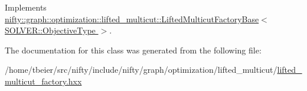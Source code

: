 Implements \hyperlink{classnifty_1_1graph_1_1optimization_1_1lifted__multicut_1_1LiftedMulticutFactoryBase_a96b3ee71a961471371c92be56d25de16}{nifty\+::graph\+::optimization\+::lifted\+\_\+multicut\+::\+Lifted\+Multicut\+Factory\+Base$<$ S\+O\+L\+V\+E\+R\+::\+Objective\+Type $>$}.



The documentation for this class was generated from the following file\+:\begin{DoxyCompactItemize}
\item 
/home/tbeier/src/nifty/include/nifty/graph/optimization/lifted\+\_\+multicut/\hyperlink{lifted__multicut__factory_8hxx}{lifted\+\_\+multicut\+\_\+factory.\+hxx}\end{DoxyCompactItemize}

